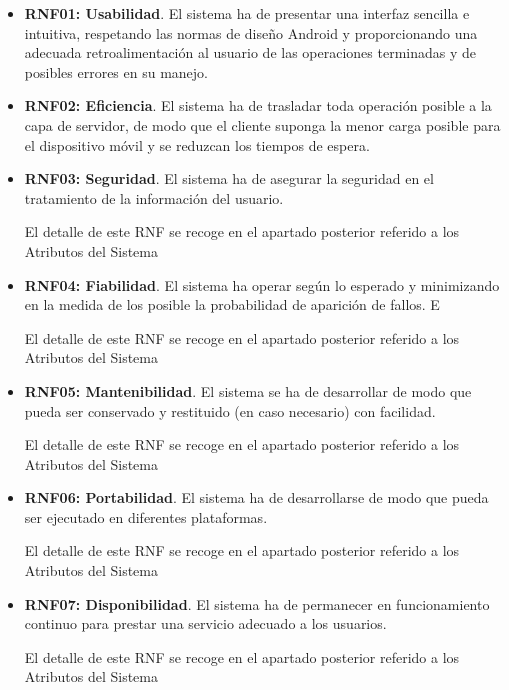 \begin{itemize}
	\item \textbf{RNF01: Usabilidad}. El sistema ha de presentar una interfaz sencilla e intuitiva, respetando las normas de diseño Android y proporcionando una adecuada retroalimentación al usuario de las operaciones terminadas y de posibles errores en su manejo.
	
	\item \textbf{RNF02: Eficiencia}. El sistema ha de trasladar toda operación posible a la capa de servidor, de modo que el cliente suponga la menor carga posible para el dispositivo móvil y se reduzcan los tiempos de espera.

	
	\item \textbf{RNF03: Seguridad}. El sistema ha de asegurar la seguridad en el tratamiento de la información del usuario. 
	
	El detalle de este \textsc{RNF} se recoge en el apartado posterior referido a los Atributos del Sistema
	
	\item \textbf{RNF04: Fiabilidad}. El sistema ha operar según lo esperado y minimizando en la medida de los posible la probabilidad de aparición de fallos. E
	
	El detalle de este \textsc{RNF} se recoge en el apartado posterior referido a los Atributos del Sistema
	
	\item \textbf{RNF05: Mantenibilidad}. El sistema se ha de desarrollar de modo que pueda ser conservado y restituido (en caso necesario) con facilidad.
	
	El detalle de este \textsc{RNF} se recoge en el apartado posterior referido a los Atributos del Sistema
	
	\item \textbf{RNF06: Portabilidad}. El sistema ha de desarrollarse de modo que pueda ser ejecutado en diferentes plataformas. 
	
	El detalle de este \textsc{RNF} se recoge en el apartado posterior referido a los Atributos del Sistema
	
	\item \textbf{RNF07: Disponibilidad}. El sistema ha de permanecer en funcionamiento continuo para prestar una servicio adecuado a los usuarios.
	
	El detalle de este \textsc{RNF} se recoge en el apartado posterior referido a los Atributos del Sistema
	
\end{itemize}

